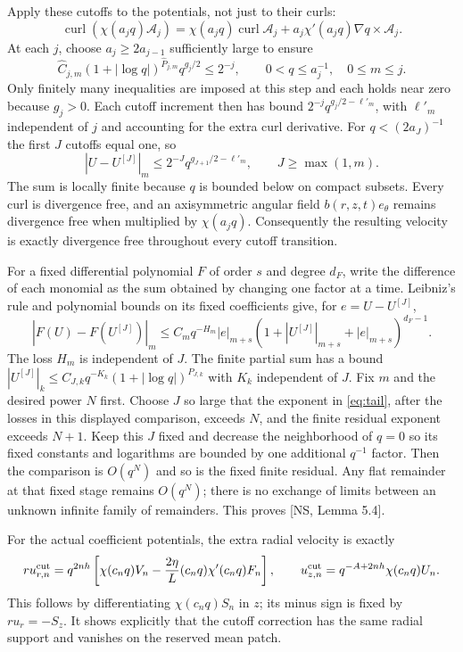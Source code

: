 \documentclass[10pt,a4paper]{article}
\newcommand{\curl}{\operatorname{curl}}\newcommand{\Div}{\operatorname{div}}
\begin{document}
Apply these cutoffs to the potentials, not just to their curls:
\[
\curl(\chi(a_jq)\mathcal A_j)
=\chi(a_jq)\curl\mathcal A_j+a_j\chi'(a_jq)\nabla q\times\mathcal A_j.
\]
At each $j$, choose $a_j\ge2a_{j-1}$ sufficiently large to ensure
\[
\widehat C_{j,m}(1+|\log q|)^{\widehat P_{j,m}}q^{g_j/2}
\le2^{-j},\qquad0<q\le a_j^{-1},\quad0\le m\le j.
\]
Only finitely many inequalities are imposed at this step and each holds near
zero because $g_j>0$. Each cutoff increment then has bound
$2^{-j}q^{g_j/2-\ell'_m}$, with $\ell'_m$ independent of $j$ and accounting
for the extra curl derivative. For $q<(2a_J)^{-1}$ the first $J$ cutoffs
equal one, so
\begin{equation}\label{eq:tail}
 |U-U^{[J]}|_m\le2^{-J}q^{g_{J+1}/2-\ell'_m},\qquad J\ge\max(1,m).
\end{equation}
The sum is locally finite because $q$ is bounded below on compact subsets.
Every curl is divergence free, and an axisymmetric angular field
$b(r,z,t)e_\theta$ remains divergence free when multiplied by $\chi(a_jq)$.
Consequently the resulting velocity is exactly divergence free throughout every
cutoff transition.

For a fixed differential polynomial $F$ of order $s$ and degree $d_F$,
write the difference of each monomial as the sum obtained by changing one
factor at a time. Leibniz's rule and polynomial bounds on its fixed coefficients
give, for $e=U-U^{[J]}$,
\[
|F(U)-F(U^{[J]})|_m
\le C_mq^{-H_m}|e|_{m+s}
(1+|U^{[J]}|_{m+s}+|e|_{m+s})^{d_F-1}.
\]
The loss $H_m$ is independent of $J$. The finite partial sum has a bound
$|U^{[J]}|_k\le C_{J,k}q^{-K_k}(1+|\log q|)^{P_{J,k}}$ with $K_k$
independent of $J$. Fix $m$ and the desired power $N$ first. Choose $J$ so
large that the exponent in \eqref{eq:tail}, after the losses in this displayed
comparison, exceeds $N$, and the finite residual exponent exceeds $N+1$.
Keep this $J$ fixed and decrease the neighborhood of $q=0$ so its fixed
constants and logarithms are bounded by one additional $q^{-1}$ factor.
Then the comparison is $O(q^N)$ and so is the fixed finite residual. Any flat
remainder at that fixed stage remains $O(q^N)$; there is no exchange of limits
between an unknown infinite family of remainders. This proves [NS, Lemma 5.4].

For the actual coefficient potentials, the extra radial velocity is exactly
\begin{equation}\label{eq:cutrad}
ru_{r,n}^{\rm cut}=q^{2nh}\left[\chi(c_nq)V_n
-\frac{2\eta}{L}(c_nq)\chi'(c_nq)F_n\right],\qquad
u_{z,n}^{\rm cut}=q^{-A+2nh}\chi(c_nq)U_n.
\end{equation}
This follows by differentiating $\chi(c_nq)S_n$ in $z$; its minus sign is
fixed by $ru_r=-S_z$. It shows explicitly that the cutoff correction has the
same radial support and vanishes on the reserved mean patch.
\end{document}
